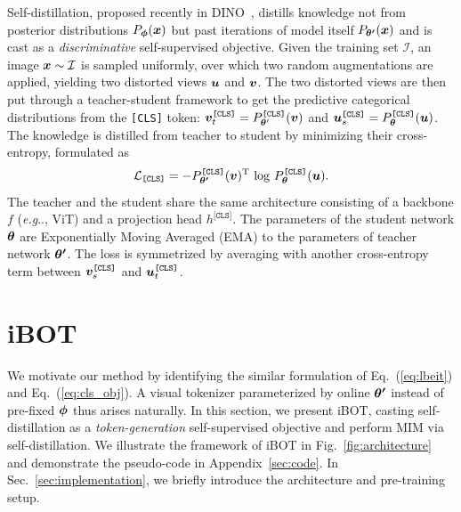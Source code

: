 \documentclass{article} %
\makeatletter
\def\ourmethod{{iBOT}\xspace}
\DeclareRobustCommand\onedot{\futurelet\@let@token\@onedot}
\def\@onedot{\ifx\@let@token.\else.\null\fi\xspace}
\def\eg{\emph{e.g}\onedot} \def\Eg{\emph{E.g}\onedot}
\makeatother
\begin{document}
Self-distillation, proposed recently in DINO~\citep{dino}, distills knowledge not from posterior distributions $P_{\bm{\phi}}({\bm{x}})$ 
but past iterations of model itself $P_{{\bm{\theta'}}}({\bm{x}})$ and is cast as a \textit{discriminative} self-supervised objective.
Given the training set $\mathcal{I}$, an image ${\bm{x}} \sim \mathcal{I}$ is sampled uniformly, over which two random augmentations are applied, yielding two distorted views ${\bm{u}}$ and ${\bm{v}}$. The two distorted views are then put through a teacher-student framework to get the predictive categorical distributions from the \texttt{[CLS]} token:  ${\bm{v}}_t^{\texttt{[CLS]}}=P_{{\bm{\theta}}^
\prime}^{\texttt{[CLS]}}({\bm{v}})$ and ${\bm{u}}_s^{\texttt{[CLS]}}=P_{{\bm{\theta}}}^{\texttt{[CLS]}}({\bm{u}})$. The knowledge is distilled from teacher to student by minimizing their cross-entropy, formulated as
\begin{equation}
\label{eq:cls_obj}
\mathcal{L}_{\texttt{[CLS]}} = - P_\vthetap^{\texttt{[CLS]}}(\vv)^\mathrm{T} \ \mathrm{log} \ P_\vtheta^{\texttt{[CLS]}}(\vu).
\end{equation}
The teacher and the student share the same architecture consisting of a backbone $f$ (\eg, ViT) and a projection head $h^\texttt{[CLS]}$. The parameters of the student network ${\bm{\theta}}$ are Exponentially Moving Averaged (EMA) to the parameters of teacher network ${\bm{\theta'}}$. 
The loss is symmetrized by averaging with another cross-entropy term between ${\bm{v}}_s^{\texttt{[CLS]}}$ and ${\bm{u}}_t^{\texttt{[CLS]}}$.


\section{\ourmethod}

We motivate our method by identifying the similar formulation of Eq.~(\ref{eq:lbeit}) and Eq.~(\ref{eq:cls_obj}). A visual tokenizer parameterized by online ${\bm{\theta'}}$ instead of pre-fixed ${\bm{\phi}}$ thus arises naturally.
In this section, we present \ourmethod, casting self-distillation as a \textit{token-generation} self-supervised objective and perform MIM via self-distillation. %
We illustrate the framework of \ourmethod in Fig.~\ref{fig:architecture} and demonstrate the pseudo-code in Appendix~\ref{sec:code}. In Sec.~\ref{sec:implementation}, we briefly introduce the architecture and pre-training setup. 
\end{document}
